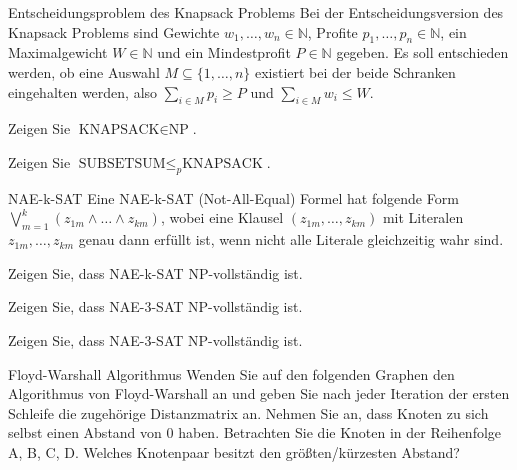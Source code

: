 \documentclass{exercisesheet}
\begin{document}
\begin{eexercises}{Entscheidungsproblem des Knapsack Problems}{
    Bei der Entscheidungsversion des Knapsack Problems sind Gewichte $w_1, \ldots, w_n \in \mathbb{N}$, Profite $p_1, \ldots, p_n \in \mathbb{N}$, ein Maximalgewicht $W \in \mathbb{N}$ und ein Mindestprofit $P \in \mathbb{N}$ gegeben. Es soll entschieden werden, ob eine Auswahl $M \subseteq \{1, \ldots, n\}$ existiert bei der beide Schranken eingehalten werden, also $\sum_{i \in M} p_i \geq P$ und $\sum_{i \in M} w_i \leq W$.
  }
  \item Zeigen Sie $\text{KNAPSACK} \in \text{NP}$.
  \item Zeigen Sie $\text{SUBSETSUM} \leq_p \text{KNAPSACK}$.
\end{eexercises}

\begin{eexercises}{NAE-k-SAT}{
    Eine NAE-k-SAT (Not-All-Equal) Formel hat folgende Form $\bigvee_{m=1}^k (z_{1m} \land \ldots \land z_{km})$, wobei eine Klausel $(z_{1m}, \ldots, z_{km})$ mit Literalen $z_{1m}, \ldots, z_{km}$ genau dann erfüllt ist, wenn nicht alle Literale gleichzeitig wahr sind.
  }
  \item Zeigen Sie, dass NAE-k-SAT NP-vollständig ist.
  \item Zeigen Sie, dass NAE-3-SAT NP-vollständig ist.
  \item Zeigen Sie, dass NAE-3-SAT NP-vollständig ist.
\end{eexercises}

\begin{exercise}{Floyd-Warshall Algorithmus}
  Wenden Sie auf den folgenden Graphen den Algorithmus von Floyd-Warshall an und geben Sie nach jeder Iteration der ersten Schleife die zugehörige Distanzmatrix an. Nehmen Sie an, dass Knoten zu sich selbst einen Abstand von 0 haben. Betrachten Sie die Knoten in der Reihenfolge A, B, C, D. Welches Knotenpaar besitzt den größten/kürzesten Abstand?
\end{exercise}
\end{document}
